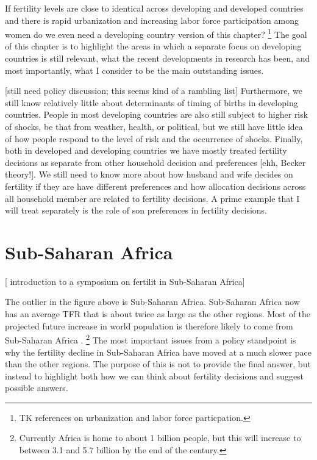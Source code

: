 \documentclass[letterpaper,12pt]{article}
\begin{document}
If fertility levels are close to identical across developing and
developed countries and there is rapid urbanization and increasing
labor force participation among women do we even need a developing 
country version of this chapter?%
\footnote{
TK references on urbanization and labor force particpation.
}
The goal of this chapter is to highlight the areas in which a
separate focus on developing countries is still relevant,
what the recent developments in research has been, and
most importantly, what I consider to be the main
outstanding issues.

[still need policy discussion; this seems kind of a rambling list]
Furthermore, we still know relatively little about determinants
of timing of births in developing countries.
People in most developing countries are also still subject to
higher risk of shocks, be that from weather, health, or political,
but we still have little idea of how people respond to the level
of risk and the occurrence of shocks.
Finally, both in developed and developing countries we have
mostly treated fertility decisions as separate from other
household decision and preferences [ehh, Becker theory!].
We still need to know more about how husband and wife decides
on fertility if they are have different preferences 
and how allocation decisions across all household member are
related to fertility decisions.
A prime example that I will treat separately is the role
of son preferences in fertility decisions.









\section{Sub-Saharan Africa}

[\citet{Ainsworth1996a} introduction to a symposium on fertilit
in Sub-Saharan Africa]

The outlier in the figure above is Sub-Saharan Africa. 
Sub-Saharan Africa now has an average TFR that is about twice
as large as the other regions.
Most of the projected future increase in world population 
is therefore likely to come from Sub-Saharan Africa 
\citep{Gerland2014}.%
\footnote{
Currently Africa is home to about 1 billion people, but this
will increase to between 3.1 and 5.7 billion by the end of
the century.
}
The most important issues from a policy standpoint is why the 
fertility decline in Sub-Saharan Africa have moved at a much
slower pace than the other regions.
The purpose of this is not to provide the final answer, but
instead to highlight both how we can think about fertility
decisions and suggest possible answers.
\end{document}
